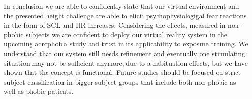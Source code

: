 

In conclusion we are able to confidently state that our virtual environment and the presented height challenge are able to elicit psychophysiologigal fear reactions in the form of SCL and HR increases. Considering the effects, measured in non-phobic subjects we are confident to deploy our virtual reality system in the upcoming acrophobia study and trust in its applicability to exposure training. We understand that our system still needs refinement and eventually one stimulating situation may not be sufficient anymore, due to a habituation effects, but we have shown that the concept is functional. Future studies should be focused on strict subject classification in bigger subject groups that include both non-phobic as well as phobic patients.